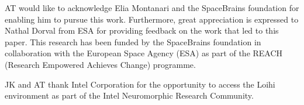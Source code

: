 \begin{acks}
  AT would like to acknowledge Elia Montanari and the SpaceBrains foundation for enabling him to pursue this work. Furthermore, great appreciation is expressed to Nathal Dorval from ESA for providing feedback on the work that led to this paper. This research has been funded by the SpaceBrains foundation in collaboration with the European Space Agency (ESA) as part of the REACH (Research Empowered Achieves Change) programme.
  
  JK and AT thank Intel Corporation for the opportunity to access the Loihi environment as part of the Intel Neuromorphic Research Community.
\end{acks}